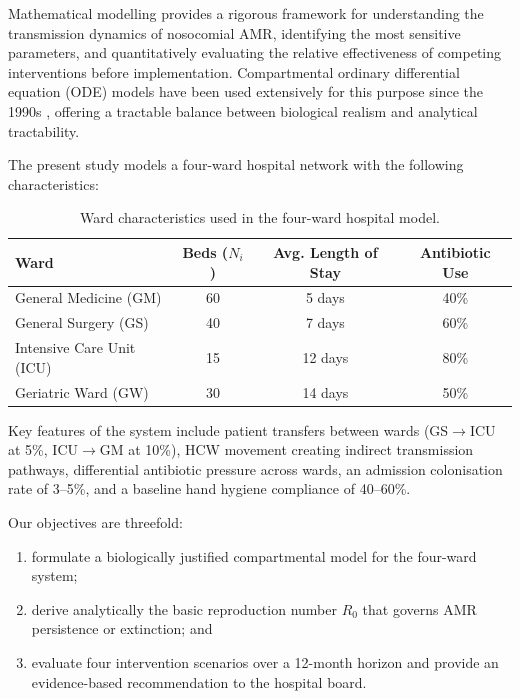 \documentclass[12pt,a4paper]{article}
\begin{document}
Mathematical modelling provides a rigorous framework for understanding the transmission dynamics of nosocomial AMR, identifying the most sensitive parameters, and quantitatively evaluating the relative effectiveness of competing interventions before implementation. Compartmental ordinary differential equation (ODE) models have been used extensively for this purpose since the 1990s \cite{lipsitch2000,webb2005,bootsma_preprint,dagata2007}, offering a tractable balance between biological realism and analytical tractability.

The present study models a four-ward hospital network with the following characteristics:

\begin{table}[H]
  \centering
  \caption{Ward characteristics used in the four-ward hospital model.}
  \label{tab:ward-characteristics}
  \begin{tabular}{>{\raggedright\arraybackslash}p{4.7cm}ccc}
    \toprule
    Ward & Beds ($N_i$) & Avg. Length of Stay & Antibiotic Use \\
    \midrule
    General Medicine (GM) & 60 & 5 days & 40\% \\
    General Surgery (GS) & 40 & 7 days & 60\% \\
    Intensive Care Unit (ICU) & 15 & 12 days & 80\% \\
    Geriatric Ward (GW) & 30 & 14 days & 50\% \\
    \bottomrule
  \end{tabular}
\end{table}

Key features of the system include patient transfers between wards (GS$\to$ICU at 5\%, ICU$\to$GM at 10\%), HCW movement creating indirect transmission pathways, differential antibiotic pressure across wards, an admission colonisation rate of 3--5\%, and a baseline hand hygiene compliance of 40--60\%.

Our objectives are threefold:
\begin{enumerate}
  \item formulate a biologically justified compartmental model for the four-ward system;
  \item derive analytically the basic reproduction number $R_0$ that governs AMR persistence or extinction; and
  \item evaluate four intervention scenarios over a 12-month horizon and provide an evidence-based recommendation to the hospital board.
\end{enumerate}
\end{document}
